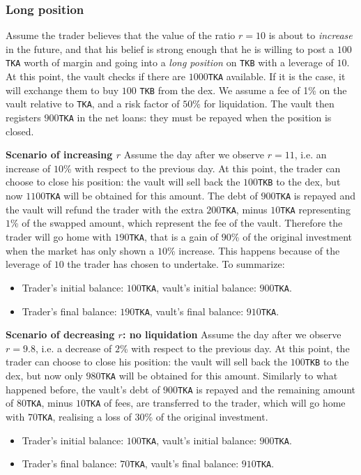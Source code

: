 \documentclass[a4paper,10 pt]{article}
\theoremstyle{definition}
\begin{document}
\subsubsection{Long position}

Assume the trader believes that the value of the ratio $r = 10$ is about to \emph{increase} in the future, and that his belief is strong enough that he is willing to post a $100$\verb|TKA| worth of margin and going into a \emph{long position} on \verb|TKB| with a leverage of $10$. At this point, the vault checks if there are $1000$\verb|TKA| available. If it is the case, it will exchange them to buy $100$ \verb|TKB| from the dex. We assume a fee of 1\% on the vault relative to \verb|TKA|, and a risk factor of $50$\% for liquidation. The vault then registers $900$\verb|TKA| in the net loans: they must be repayed when the position is closed.

\textbf{Scenario of increasing $r$}
Assume the day after we observe $r = 11$, i.e. an increase of $10$\% with respect to the previous day. At this point, the trader can choose to close his position: the vault will sell back the $100$\verb|TKB| to the dex, but now $1100$\verb|TKA| will be obtained for this amount. The debt of $900$\verb|TKA| is repayed and the vault will refund the trader with the extra $200$\verb|TKA|, minus $10$\verb|TKA| representing $1$\% of the swapped amount, which represent the fee of the vault. Therefore the trader will go home with $190$\verb|TKA|, that is a gain of $90$\% of the original investment when the market has only shown a $10$\% increase. This happens because of the leverage of $10$ the trader has chosen to undertake. To summarize:
\begin{itemize}
    \item Trader's initial balance: $100$\verb|TKA|, vault's initial balance: $900$\verb|TKA|.
    \item Trader's final balance: $190$\verb|TKA|, vault's final balance: $910$\verb|TKA|.
\end{itemize}

\textbf{Scenario of decreasing $r$: no liquidation}
Assume the day after we observe $r = 9.8$, i.e. a decrease of $2$\% with respect to the previous day.  At this point, the trader can choose to close his position: the vault will sell back the $100$\verb|TKB| to the dex, but now only $980$\verb|TKA| will be obtained for this amount. Similarly to what happened before, the vault's debt of $900$\verb|TKA| is repayed and the remaining amount of $80$\verb|TKA|, minus $10$\verb|TKA| of fees, are transferred to the trader, which will go home with $70$\verb|TKA|, realising a loss of $30$\% of the original investment.
\begin{itemize}
    \item Trader's initial balance: $100$\verb|TKA|, vault's initial balance: $900$\verb|TKA|.
    \item Trader's final balance: $70$\verb|TKA|, vault's final balance: $910$\verb|TKA|.
\end{itemize}
\end{document}
